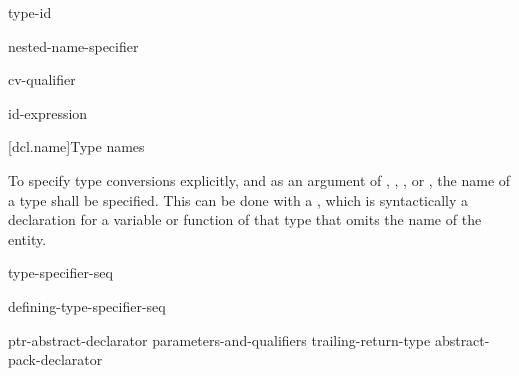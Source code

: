 \begin{bnf}
\br
    \terminal{->} type-id
\end{bnf}

\begin{bnf}
\br
    \terminal{*}  \br
    \terminal{\&} \br
    \terminal{\&\&} \br
    nested-name-specifier \terminal{*}  
\end{bnf}

\begin{bnf}
\br
    cv-qualifier 
\end{bnf}

\begin{bnf}
\br
    \br
\end{bnf}

\begin{bnf}
\br
    \terminal{\&}\br
    \terminal{\&\&}
\end{bnf}

\begin{bnf}
\br
     id-expression
\end{bnf}

[dcl.name]{Type names}

\pnum
{}%
To specify type conversions explicitly,
%
and as an argument of
,
,
,
or
,
the name of a type shall be specified.
This can be done with a
,
which is syntactically a declaration for a variable or function
of that type that omits the name of the entity.

\begin{bnf}
\br
    type-specifier-seq 
\end{bnf}

\begin{bnf}
\br
    defining-type-specifier-seq 
\end{bnf}

\begin{bnf}
\br
    ptr-abstract-declarator\br
     parameters-and-qualifiers trailing-return-type\br
    abstract-pack-declarator
\end{bnf}

